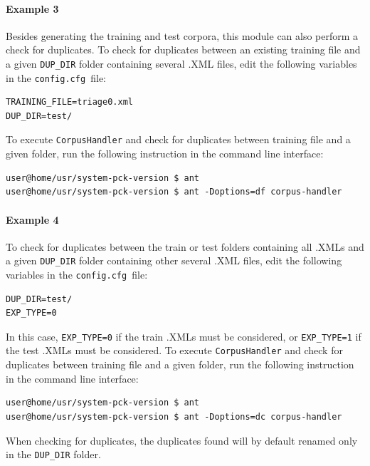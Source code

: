 \documentclass[11pt]{article}
\newcommand{\configfile}{\texttt{config.cfg{ }}}
\begin{document}
\paragraph{Example 3}
Besides generating the training and test corpora, this module can also perform a check for duplicates.
To check for duplicates between an existing training file 
and a given \texttt{DUP\_DIR} folder containing several .XML files, 
edit the following variables in the \configfile file:
\begin{lstlisting}
TRAINING_FILE=triage0.xml
DUP_DIR=test/
\end{lstlisting}
To execute \texttt{CorpusHandler} and check for duplicates between training file and a given folder,
run the following instruction in the command line interface:
\begin{lstlisting}
user@home/usr/system-pck-version $ ant
user@home/usr/system-pck-version $ ant -Doptions=df corpus-handler
\end{lstlisting}
\paragraph{Example 4}
To check for duplicates between the train or test folders containing all .XMLs and 
a given \texttt{DUP\_DIR} folder containing other several .XML files, 
edit the following variables in the \configfile file:
\begin{lstlisting}
DUP_DIR=test/
EXP_TYPE=0
\end{lstlisting}
In this case, \texttt{EXP\_TYPE=0} if the train .XMLs must be considered, 
or \texttt{EXP\_TYPE=1} if the test .XMLs must be considered.
To execute \texttt{CorpusHandler} and check for duplicates between training file and a given folder,
run the following instruction in the command line interface:
\begin{lstlisting}
user@home/usr/system-pck-version $ ant
user@home/usr/system-pck-version $ ant -Doptions=dc corpus-handler
\end{lstlisting}
When checking for duplicates, the duplicates found will by default renamed only in the \texttt{DUP\_DIR} folder. \\
\end{document}
